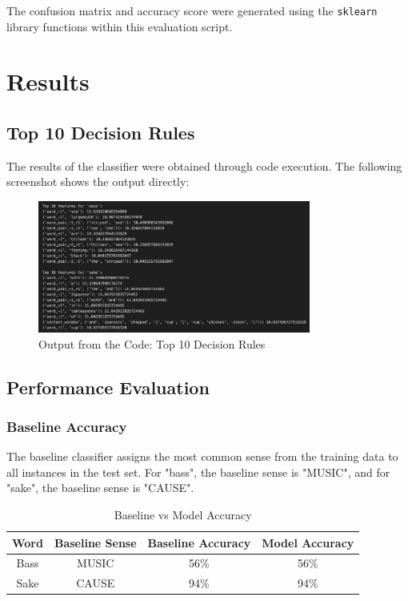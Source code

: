 \documentclass[journal,onecolumn]{IEEEtran}
\begin{document}
The confusion matrix and accuracy score were generated using the \texttt{sklearn} library functions within this evaluation script.

\section{Results}

\subsection{Top 10 Decision Rules}

The results of the classifier were obtained through code execution. The following screenshot shows the output directly:

\begin{figure}[H]
    \centering
    \includegraphics[width=0.8\textwidth]{Image 9-15-24 at 12.54.jpeg} %
    \caption{Output from the Code: Top 10 Decision Rules}
    \label{fig:code_results}
\end{figure}

\subsection{Performance Evaluation}

\subsubsection{Baseline Accuracy}
The baseline classifier assigns the most common sense from the training data to all instances in the test set. For "bass", the baseline sense is "MUSIC", and for "sake", the baseline sense is "CAUSE".

\begin{table}[H]
\caption{Baseline vs Model Accuracy}
\centering
\begin{tabular}{|c|c|c|c|}
\hline
Word & Baseline Sense & Baseline Accuracy & Model Accuracy \\ \hline
Bass & MUSIC & 56\% & 56\% \\ \hline
Sake & CAUSE & 94\% & 94\% \\ \hline
\end{tabular}
\end{table}
\end{document}
